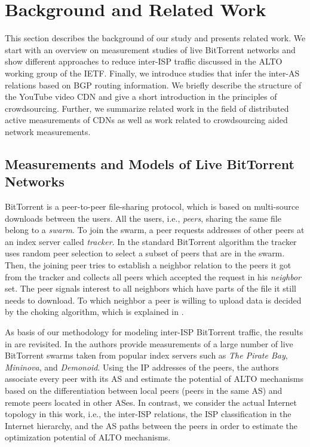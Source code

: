 \section{Background and Related Work}\label{sec:p2p:background}

This section describes the background of our study and presents related work. We start with an overview on measurement studies of live BitTorrent networks and show different approaches to reduce inter-ISP traffic discussed in the ALTO working group of the IETF. Finally, we introduce studies that infer the inter-AS relations based on BGP routing information.
We briefly describe the structure of the YouTube video CDN and give a short introduction in the principles of crowdsourcing.
Further, we summarize related work in the field of distributed active measurements of CDNs as well as work related to crowdsourcing aided network measurements. 

\subsection{Measurements and Models of Live BitTorrent Networks}

BitTorrent is a peer-to-peer file-sharing protocol, which is based on multi-source downloads between the users. All the users, i.e., \textit{peers}, sharing the same file belong to a \textit{swarm}. To join the swarm, a peer requests addresses of other peers at an index server called \textit{tracker}. In the standard BitTorrent algorithm the tracker uses random peer selection to select a subset of peers that are in the swarm. Then, the joining peer tries to establish a neighbor relation to the peers it got from the tracker and collects all peers which accepted the request in his \textit{neighbor} set. The peer signals interest to all neighbors which have parts of the file it still needs to download. To which neighbor a peer is willing to upload data is decided by the choking algorithm, which is explained in \cite{cohen:bt}.

As basis of our methodology for modeling inter-ISP BitTorrent traffic, the results in \cite{Hossfeld2011} are revisited. In \cite{Hossfeld2011} the authors provide measurements of a large number of live BitTorrent swarms taken from popular index servers such as \emph{The Pirate Bay}, \emph{Mininova}, and \emph{Demonoid}. Using the IP addresses of the peers, the authors associate every peer with its AS and estimate the potential of ALTO mechanisms based on the differentiation between local peers (peers in the same AS) and remote peers located in other ASes. In contrast, we consider the actual Internet topology in this work, i.e., the inter-ISP relations, the ISP classification in the Internet hierarchy, and the AS paths between the peers in order to estimate the optimization potential of ALTO mechanisms.   

